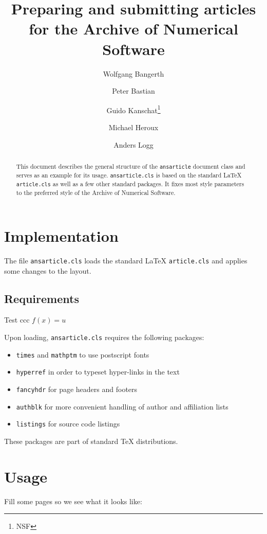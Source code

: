 \documentclass{ansarticle}
\title{Preparing and submitting articles for the Archive of Numerical
  Software}
\author[1]{Wolfgang Bangerth}
\author[2]{Peter Bastian}
\author[1]{Guido Kanschat\thanks{NSF}}
\author[3]{Michael Heroux}
\author[4]{Anders Logg}
\affil[1]{Department of Mathematics, Texas A\&M University}
\affil[2]{IWR, Universit\"at Heidelberg}
\affil[3]{Sandia National Laboratories}
\affil[4]{Simula, Oslo}
\begin{document}
\maketitle

\begin{abstract}
  This document describes the general structure of the
  \texttt{ansarticle} document class and serves as an example for its
  usage. \texttt{ansarticle.cls} is based on the standard \LaTeX{}
  \texttt{article.cls} as well as a few other standard packages. It
  fixes most style parameters to the preferred style of the Archive of
  Numerical Software.
\end{abstract}

\section{Implementation}

The file \texttt{ansarticle.cls} loads the standard LaTeX
\texttt{article.cls} and applies some changes to the layout.

\subsection{Requirements}

Test ccc $f(x) = u$

Upon loading, \texttt{ansarticle.cls} requires the following packages:

\begin{itemize}
\item \texttt{times} and \texttt{mathptm} to use postscript fonts
\item \texttt{hyperref} in order to typeset hyper-links in the text
\item \texttt{fancyhdr} for page headers and footers
\item \texttt{authblk} for more convenient handling of author and
  affiliation lists
\item \texttt{listings} for source code listings
\end{itemize}
These packages are part of standard \TeX{} distributions.

\section{Usage}

Fill some pages so we see what it looks like:
\end{document}
